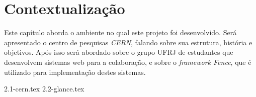 \chapter{Contextualização}\label{cap_contextualizacao}

Este capítulo aborda o ambiente no qual este projeto foi desenvolvido. Será apresentado o centro de pesquisas \emph{CERN}, falando sobre sua estrutura, história e objetivos. Após isso será abordado sobre o grupo UFRJ de estudantes que desenvolvem sistemas web para a colaboração, e sobre o \emph{framework Fence}, que é utilizado para implementação destes sistemas.

{2.1-cern.tex}
{2.2-glance.tex}